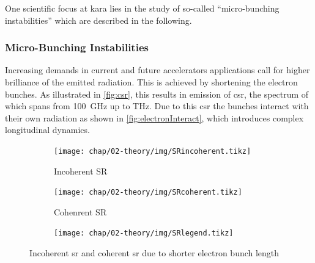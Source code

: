 One scientific focus at \gls{kara} lies in the study of so-called ``micro-bunching instabilities'' which are described in the following.

\subsubsection*{Micro-Bunching Instabilities}
Increasing demands in current and future accelerators applications call for higher brilliance of the emitted radiation.
This is achieved by shortening the electron bunches. 
As illustrated in \autoref{fig:csr}, this results in emission of \gls{csr}, the spectrum of which spans from \SI{100}{\GHz} up to THz.
Due to this \gls{csr} the bunches interact with their own radiation as shown in \autoref{fig:electronInteract}, which introduces complex longitudinal dynamics.
\begin{figure}[tbh]
	\centering
	\begin{subfigure}{0.4\textwidth}
		\centering
		\texttt{[image: chap/02-theory/img/SRincoherent.tikz]}  
		\caption{Incoherent SR}
		\label{fig:srincoherent}
	\end{subfigure}
	\hfill
	\begin{subfigure}{0.4\textwidth}
		\centering
		\texttt{[image: chap/02-theory/img/SRcoherent.tikz]}  
		\caption{Cohenrent SR}
		\label{fig:srcoherent}
	\end{subfigure}
	\begin{center}
		\begin{subfigure}{0.4\textwidth}
			\centering
			\texttt{[image: chap/02-theory/img/SRlegend.tikz]}  
			\label{fig:srlegend}
		\end{subfigure}
	\end{center}
	\caption[Incoherent and coherent SR]{Incoherent \gls{sr} and coherent \gls{sr} due to shorter electron bunch length \cite{rota2018}}
	\label{fig:csr}
\end{figure}


